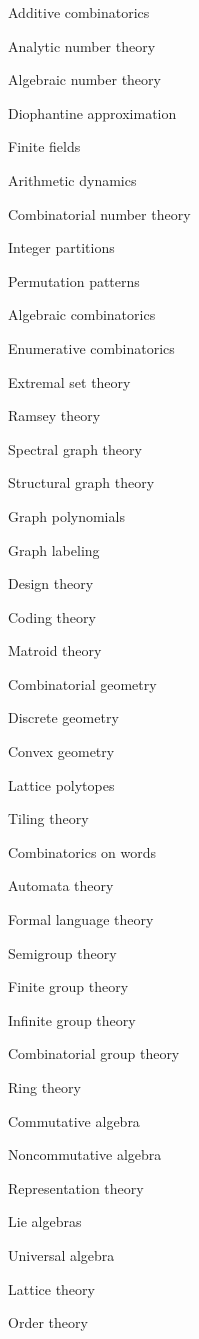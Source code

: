 \item Additive combinatorics
\item Analytic number theory
\item Algebraic number theory
\item Diophantine approximation
\item Finite fields
\item Arithmetic dynamics
\item Combinatorial number theory
\item Integer partitions
\item Permutation patterns
\item Algebraic combinatorics
\item Enumerative combinatorics
\item Extremal set theory
\item Ramsey theory
\item Spectral graph theory
\item Structural graph theory
\item Graph polynomials
\item Graph labeling
\item Design theory
\item Coding theory
\item Matroid theory
\item Combinatorial geometry
\item Discrete geometry
\item Convex geometry
\item Lattice polytopes
\item Tiling theory
\item Combinatorics on words
\item Automata theory
\item Formal language theory
\item Semigroup theory
\item Finite group theory
\item Infinite group theory
\item Combinatorial group theory
\item Ring theory
\item Commutative algebra
\item Noncommutative algebra
\item Representation theory
\item Lie algebras
\item Universal algebra
\item Lattice theory
\item Order theory
